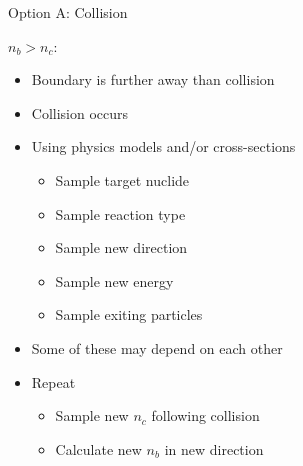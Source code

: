 \documentclass[xcolor=x11names,compress]{beamer}
\renewcommand{\(}{\begin{columns}}
\renewcommand{\)}{\end{columns}}
\newcommand{\<}[1]{\begin{column}{#1}}
\renewcommand{\>}{\end{column}}
\begin{document}
\begin{frame}{Option A: Collision}

  \underline{$n_b > n_c$}:
  \begin{itemize}
    \item Boundary is further away than collision
    \item \alert{Collision occurs}
  \end{itemize}
    \vspace*{0.5 em}
  \pause

\begin{itemize}
  \item Using physics models and/or cross-sections
  \begin{itemize}
    \item Sample target nuclide
    \item Sample reaction type
    \item Sample new direction 
    \item Sample new energy 
    \item Sample exiting particles 
  \end{itemize}
  \item Some of these may depend on each other
  \vspace*{0.5 em}
  \pause
  \item Repeat
  \begin{itemize}
    \item Sample new $n_c$ following collision
    \item Calculate new $n_b$ in new direction
  \end{itemize}
\end{itemize}


\end{frame}
\end{document}
